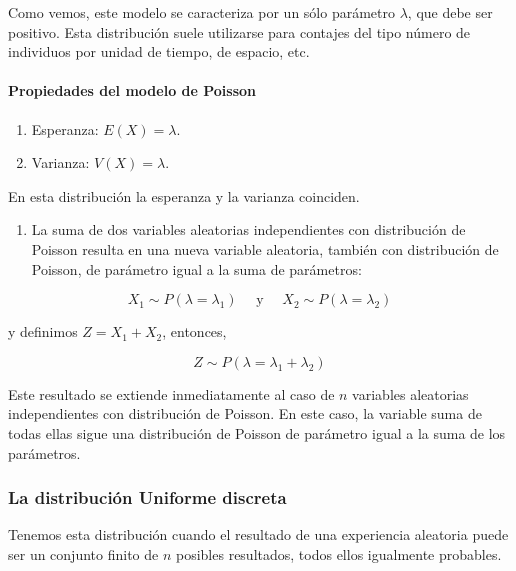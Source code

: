 \documentclass[
]{article}
\providecommand{\tightlist}{%
  \setlength{\itemsep}{0pt}\setlength{\parskip}{0pt}}
\begin{document}
Como vemos, este modelo se caracteriza por un sólo parámetro \(\lambda\), que debe ser positivo.
Esta distribución suele utilizarse para contajes del tipo número de individuos por unidad de tiempo, de espacio, etc.

\paragraph{Propiedades del modelo de Poisson}\label{propiedades-del-modelo-de-poisson}

\begin{enumerate}
\def\labelenumi{\arabic{enumi}.}
\tightlist
\item
  Esperanza: \(E(X)=\lambda\).
\item
  Varianza: \(V(X)=\lambda\).
\end{enumerate}

En esta distribución la esperanza y la varianza coinciden.

\begin{enumerate}
\def\labelenumi{\arabic{enumi}.}
\setcounter{enumi}{2}
\tightlist
\item
  La suma de dos variables aleatorias independientes con distribución de Poisson resulta en una nueva variable aleatoria, también con distribución de Poisson, de parámetro igual a la suma de parámetros:
\end{enumerate}

\[
X_{1} \sim P\left(\lambda=\lambda_{1}\right) \quad \text { y } \quad X_{2} \sim P\left(\lambda=\lambda_{2}\right)
\]

y definimos \(Z=X_{1}+X_{2}\), entonces,

\[
Z \sim P\left(\lambda=\lambda_{1}+\lambda_{2}\right)
\]

Este resultado se extiende inmediatamente al caso de \(n\) variables aleatorias independientes con distribución de Poisson. En este caso, la variable suma de todas ellas sigue una distribución de Poisson de parámetro igual a la suma de los parámetros.

\subsubsection{La distribución Uniforme discreta}\label{la-distribuciuxf3n-uniforme-discreta}

Tenemos esta distribución cuando el resultado de una experiencia aleatoria puede ser un conjunto finito de \(n\) posibles resultados, todos ellos igualmente probables.
\end{document}
